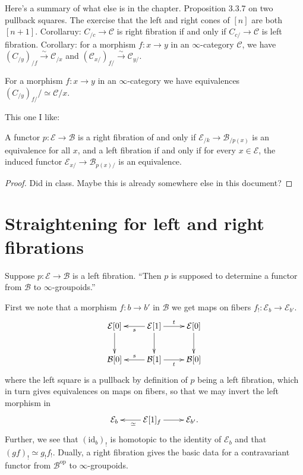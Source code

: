 \medskip\noindent
Here's a summary of what else is in the chapter.
Proposition 3.3.7 on two pullback squares.
The exercise that the left and right cones of $[n]$ are both $[n+1]$.
Corollaruy: $C_{/c}\to \mathcal{C}$ is right fibration
if and only if $C_{c/}\to \mathcal{C}$ is left fibration.
Corollary: for a morphism  $f:x \to y$ in an $\infty$-category $\mathcal{C}$,
we have $(C_{/y})_{/f}\xrightarrow{\sim}\mathcal{C}_{/x}$
and $(\mathcal{C}_{x/})_{f/}\xrightarrow{\sim}\mathcal{C}_{y/}$.

\begin{lemma}
\label{lemma-3.3.9}
For a morphism $f:x \to y$ in an $\infty$-category
we have equivalences $(C_{/y})_{f/}/\simeq \mathcal{C}{/x} $.
\end{lemma}


\medskip\noindent
This one I like:

\begin{lemma}
\label{lemma-left-fibration-iff-induced}
A functor $p:\mathcal{E} \to \mathcal{B}$ is a
right fibration of and only if
$\mathcal{E}_{/k}\to\mathcal{B}_{/p(x)}$
is an equivalence for all $x$, and a
left fibration
if and only if for every $x \in \mathcal{E}$,
the induced functor $\mathcal{E}_{x/}\to \mathcal{B}_{p(x)/}$ 
is an equivalence.
\end{lemma}

\begin{proof}
Did in class. Maybe this is already somewhere else in this document?
\end{proof}






\section{Straightening for left and right fibrations}
\label{section-straightening}

\noindent
Suppose $p:\mathcal{E} \to \mathcal{B}$ is a left fibration.
``Then $p$ is supposed to determine a functor
from $\mathcal{B}\text{}$ to $\infty$-groupoids.''

First we note that a morphism $f:b \to b'$ in $\mathcal{B}$
we get maps on fibers $f_!:\mathcal{E}_b \to \mathcal{E}_{b'}$.
$$
\xymatrix{
\mathcal{E}[0]\ar[d]&\mathcal{E}[1]\ar[l]^s\ar[d]\ar[r]^t&
\mathcal{E}[0]\ar[d]\\
\mathcal{B}[0]&\mathcal{B}[1]\ar[l]_s\ar[r]_t&\mathcal{B}[0]
}
$$
where the left square is a pullback by definition of
$p$ being a left fibration, which in turn gives
equivalences on maps on fibers, so that we may invert the
left morphism in
$$
\xymatrix{
\mathcal{E}_b & \mathcal{E}[1]_f\ar[l]^\simeq \ar[r]& \mathcal{E}_{b'}.
}
$$
Further, we see that $(\text{id}_b)_!$ is 
homotopic to the identity of $\mathcal{E}_b$
and that $(gf)_! \simeq g_!f_!$.
Dually, a right fibration gives the
basic data for a contravariant functor from
$\mathcal{B}^{\text{op}}$ to $\infty$-groupoids.


